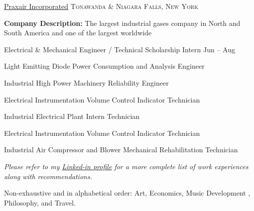 \documentclass[12pt,a3paper]{article}
\begin{document}
\headedsection
  {\href{http://www.praxair.com/international-locations}{Praxair Incorporated}}
  {\textsc{Tonawanda \& Niagara Falls, New York }} {
  
  {\textbf{Company Description:} The largest industrial gases company in North and South America and one of the largest worldwide}
  
  
  \headedsubsection
  {Electrical \& Mechanical Engineer / Technical Scholarship Intern} 
  {Jun  -- Aug }
  
  \begin{positions}
  \setlength{\itemindent}{.9in}
    \item[\apo 13] {Light Emitting Diode Power Consumption and Analysis Engineer}
    \item[\apo 12] {Industrial High Power Machinery Reliability Engineer}
    \item[\apo 11] {Electrical Instrumentation Volume Control Indicator Technician}
    \item[\apo 10] {Industrial Electrical Plant Intern Technician}
    \item[\apo 09] {Electrical Instrumentation Volume Control Indicator Technician}
    \item[\apo 08] {Industrial Air Compressor and Blower Mechanical Rehabilitation Technician}
  \end{positions}
    
}

\vspace{-0.2em}
\begin{center}
  \emph{\small Please refer to my \href{https://www.linkedin.com/in/rhbaker2014/}{Linked-in profile} for a more complete list of work experiences along with recommendations.}
\end{center}


\spacedhrule{-0.2em}{-0.4em}


\inlineheadsection
  {Non-exhaustive and in alphabetical order:}
  {Art, Economics, Music Development , Philosophy, and Travel.}
  
\end{document}
